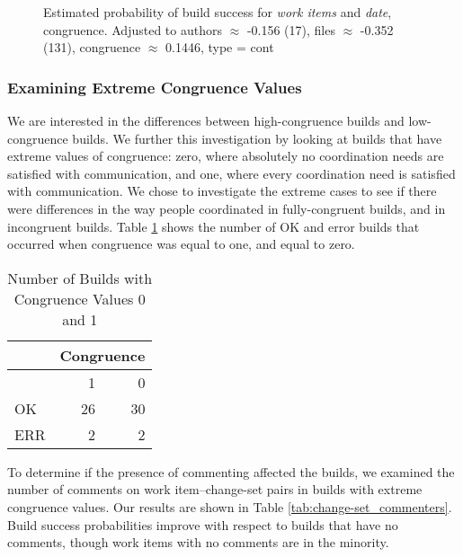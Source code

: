 \begin{figure}[t]
\centering
  \caption{Estimated probability of build success for \emph{work items} and \emph{date},  congruence. Adjusted to authors $\approx$ -0.156 (17), files $\approx$ -0.352 (131), congruence $\approx$ 0.1446, type = cont}
  \label{fig:weighted_congruence_workitems_age}
\end{figure}

\subsubsection{Examining Extreme Congruence Values}
\label{sec:extremecongruence}
We are interested in the differences between high-congruence builds and low-congruence builds.
We further this investigation by looking at builds that have extreme values of congruence: zero, where absolutely no coordination needs are satisfied with communication, and one, where every coordination need is satisfied with communication.
We chose to investigate the extreme cases to see if there were differences in the way people coordinated in fully-congruent builds, and in incongruent builds.
Table \ref{tab:congruence_extremes} shows the number of OK and error builds that occurred when congruence was equal to one, and equal to zero. 


\begin{table}[t]
\centering
\caption{Number of Builds with Congruence Values 0 and 1}
\begin{tabular}{lrr}
\toprule
& \multicolumn{2}{c}{Congruence} \\\midrule
& 1 & 0 \\\midrule
  OK & 26 & 30 \\
                             ERR & 2 & 2 \\
 \bottomrule
\end{tabular}
\label{tab:congruence_extremes}
\end{table}

To determine if the presence of commenting affected the builds, we examined the number of comments on work item--change-set pairs in builds with extreme congruence values. Our results are shown in Table \ref{tab:change-set_commenters}. Build success probabilities improve with respect to builds that have no comments, though work items with no comments are in the minority.

